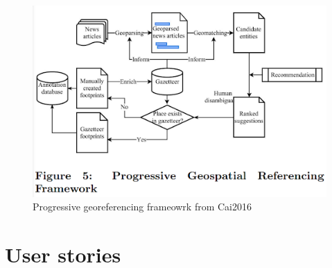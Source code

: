 \begin{figure}[H]
	\centering
	\includegraphics[width=.9\linewidth]{images/cai2016_figure5.png}
	\caption{Progressive georeferencing frameowrk from Cai2016}%
	\label{fig:cai2016_f5}
\end{figure}

\section{User stories}
